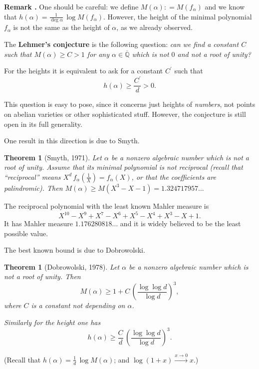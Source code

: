\documentclass{article}
\newtheorem{theorem}[proposition]{Theorem}
\theoremstyle{definition}
\newcommand{\term}{\textbf}
\newcommand{\dfn}{\mathrel{\mathop:}=}
\newcommand{\QQ}{\mathbb{Q}}
\newenvironment{remark}
{ \begin{shaded}\begingroup\small\noindent\refstepcounter{proposition}\textbf{Remark \theproposition.} }
{ \endgroup\end{shaded} }
\begin{document}
\begin{remark}
  One should be careful: we define $M (\alpha) \dfn M (f_\alpha)$ and we know
  that $h (\alpha) = \frac{1}{\deg \alpha} \, \log M (f_\alpha)$. However, the
  height of the minimal polynomial $f_\alpha$ is not the same as the height of
  $\alpha$, as we already observed.
\end{remark}

The \term{Lehmer's conjecture} is the following question:
\emph{can we find a constant $C$ such that $M (\alpha) \ge C > 1$ for any
  $\alpha \in \overline{\QQ}$ which is not $0$ and not a root of unity?}

For the heights it is equivalent to ask for a constant $C^\prime$ such that
$$h (\alpha) \ge \frac{C^\prime}{d} > 0.$$

This question is easy to pose, since it concerns just heights of \emph{numbers},
not points on abelian varieties or other sophisticated stuff. However, the
conjecture is still open in its full generality.

One result in this direction is due to Smyth.

\begin{theorem}[Smyth, 1971]
  Let $\alpha$ be a nonzero algebraic number which is not a root of
  unity. Assume that its minimal polynomial is not reciprocal (recall that
  ``reciprocal'' means $X^d\,f_\alpha (\frac{1}{X}) = f_\alpha (X)$, or that the
  coefficients are palindromic). Then
  $M (\alpha) \ge M (X^3 - X - 1) = 1.324717957\ldots$
\end{theorem}

The reciprocal polynomial with the least known Mahler measure is
$$X^{10} - X^9 + X^7 - X^6 + X^5 - X^4 + X^3 - X + 1.$$
It has Mahler measure $1.176280818\ldots$ and it is widely believed to be the
least possible value.

The best known bound is due to Dobrowolski.

\begin{theorem}[Dobrowolski, 1978]
  Let $\alpha$ be a nonzero algebraic number which is not a root of unity. Then
  $$M (\alpha) \ge 1 + C\,\left(\frac{\log \log d}{\log d}\right)^3,$$
  where $C$ is a constant not depending on $\alpha$.

  Similarly for the height one has
  $$h (\alpha) \ge \frac{C}{d} \, \left(\frac{\log \log d}{\log d}\right)^3.$$
\end{theorem}

\noindent (Recall that $h (\alpha) = \frac{1}{d}\,\log M (\alpha)$;
and $\log (1+x) \xrightarrow{x \to 0} x$.)
\end{document}
